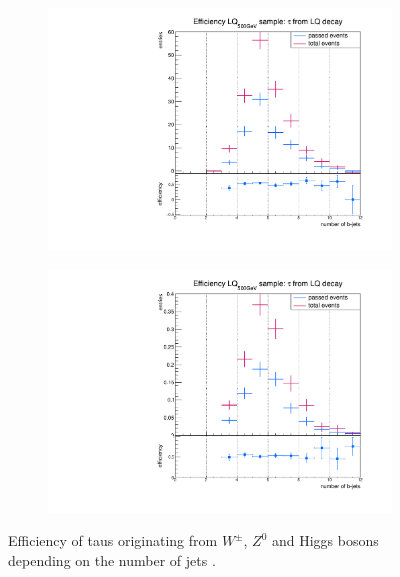 \begin{figure}
\begin{subfigure}[t]{0.49\textwidth}
                \label{Dividedprompt:signal:njetsLQ76}
                \end{subfigure}
                \begin{subfigure}[t]{0.49\textwidth}
                \includegraphics[width=\textwidth]{figures/plots/LQ75/Divided_fromLQnjets.pdf}
                \label{DividedFromLQ:signal:njetsLQ75}
                \end{subfigure}
                \begin{subfigure}[t]{0.49\textwidth}
                \includegraphics[width=\textwidth]{figures/plots/LQ76/Divided_fromLQnjets.pdf}
                \label{DividedFromLQ:signal:njetsLQ76}
                \end{subfigure}
\caption[Efficiency of taus originating from $W^\pm$, $Z^0$ and Higgs bosons for the Higgs background events.]{Efficiency of taus originating from $W^\pm$, $Z^0$ and Higgs bosons depending on the number of jets .}
\label{Divided:signal:njets}
\end{figure}
